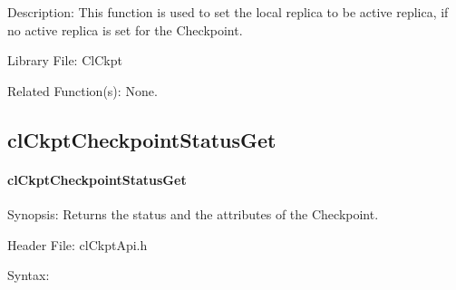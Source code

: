\begin{flushleft}
\begin{Desc}
\begin{description}
\end{description}
\end{Desc}
\begin{Desc}
\item[Description:]This function is used to set the local replica to be active replica, if no active replica is set for the Checkpoint.\end{Desc}
\begin{Desc}
\item[Library File:]Cl\-Ckpt\end{Desc}
\begin{Desc}
\item[Related Function(s):]None. \end{Desc}
\newpage


\subsection{clCkptCheckpointStatusGet}
\hypertarget{pageckpt109}{}\paragraph{cl\-Ckpt\-Checkpoint\-Status\-Get}\label{pageckpt109}
\begin{Desc}
\item[Synopsis:]Returns the status and the attributes of the Checkpoint.\end{Desc}
\begin{Desc}
\item[Header File:]clCkptApi.h\end{Desc}
\begin{Desc}
\item[Syntax:]


\end{Desc}
\end{flushleft}
